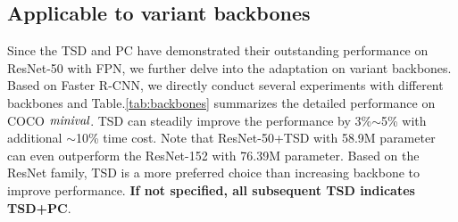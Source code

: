 \documentclass[10pt,twocolumn,letterpaper]{article}
\def \algname{TSD}
\def \loss{PC}
\begin{document}
\begin{table}[h]
\centering
\begin{center}
\end{center}
\caption{Results of \algname{} + \loss{} with variant backbones. DCN means deformable convolution. The runtime includes network forward and post-processing (e.g., NMS for object detection). The runtime is the averaged value on a single Tesla V100 GPU and CPU E5-2680 v4.}
\label{tab:backbones}
\end{table}


\subsection{Applicable to variant backbones}
Since the \algname{} and \loss{} have demonstrated their outstanding performance on ResNet-50 with FPN, we further delve into the adaptation on variant backbones.
Based on Faster R-CNN, we directly conduct several experiments with different backbones and Table.\ref{tab:backbones} summarizes the detailed performance on COCO $\emph{minival}$.
TSD can steadily improve the performance by 3\%$\sim$5\% with additional $\sim$10\% time cost. Note that ResNet-50+TSD with 58.9M parameter can even outperform the ResNet-152 with 76.39M parameter.
Based on the ResNet family, TSD is a more preferred choice than increasing backbone to improve performance.
\textbf{If not specified, all subsequent \algname{} indicates \algname{}+\loss{}}.
\end{document}
